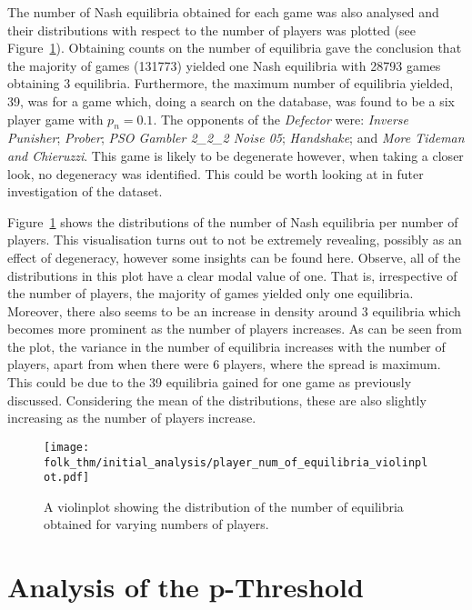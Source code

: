 The number of Nash equilibria obtained for each game was also analysed and
their distributions with respect to the number of players was plotted
(see Figure~\ref{fig:NE_violinplot}). Obtaining counts on the number of equilibria gave the conclusion that the
majority of games
(131773) yielded one Nash equilibria with 28793 games obtaining 3 equilibria.
Furthermore, the maximum number of equilibria yielded, 39, was for a game which,
doing a search on the database, was found to be a six player game with
\(p_{n}=0.1\). The opponents of the \textit{Defector} were: \textit{Inverse
Punisher}; \textit{Prober}; \textit{PSO Gambler 2\_2\_2 Noise 05};
\textit{Handshake}; and \textit{More Tideman and Chieruzzi}. This game is likely to be degenerate however, when taking a closer look, no degeneracy was identified. This could be worth looking at in
futer investigation of the dataset. 

Figure~\ref{fig:NE_violinplot} shows the distributions of the number of Nash
equilibria per number of players. This visualisation turns out to not be
extremely revealing, possibly as an effect of degeneracy, however some
insights can be found here. Observe, all of the distributions in this plot have a clear modal value of one. That is, irrespective of
the number of players, the majority of games yielded only one equilibria.
Moreover, there also seems to be an increase in density around 3 equilibria
which becomes more prominent as the number of players increases. As can
be seen from the plot, the variance in the number of equilibria increases with
the number of players, apart from when there were 6 players, where the spread is maximum. This could be due to the 39 equilibria
gained for one game as previously discussed. Considering the mean
of the distributions, these are also slightly increasing as the
number of players increase. 

\begin{figure}      
    \centering
    \texttt{[image: folk\_thm/initial\_analysis/player\_num\_of\_equilibria\_violinplot.pdf]}
    \caption{A violinplot showing the distribution of the number of equilibria obtained for varying numbers of players.}\label{fig:NE_violinplot}
\end{figure}



\section{Analysis of the p-Threshold}\label{sec:Analysis_of_the_p-Threshold}

